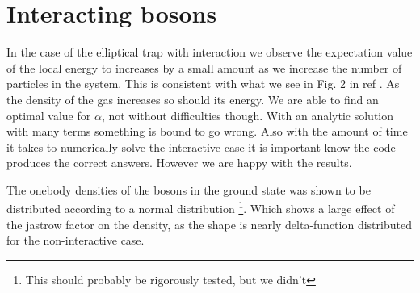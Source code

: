 \section{Interacting bosons}
In the case of the elliptical trap with interaction we observe the expectation value of the local energy to increases by a small amount as we increase the number of particles in the system. This is consistent with what we see in Fig. 2 in ref \cite{VMC}. As the density of the gas increases so should its energy. 
We are able to find an optimal value for $\alpha$, not without difficulties though. With an analytic solution with many terms something is bound to go wrong. Also with the amount of time it takes to numerically solve the interactive case it is important know the code produces the correct answers. However we are happy with the results.

The onebody densities of the bosons in the ground state was shown to be distributed according to a normal distribution  \footnote{This should probably be rigorously tested, but we didn't}. Which shows a large effect of the jastrow factor on the density, as the shape is nearly delta-function distributed for the non-interactive case. 
